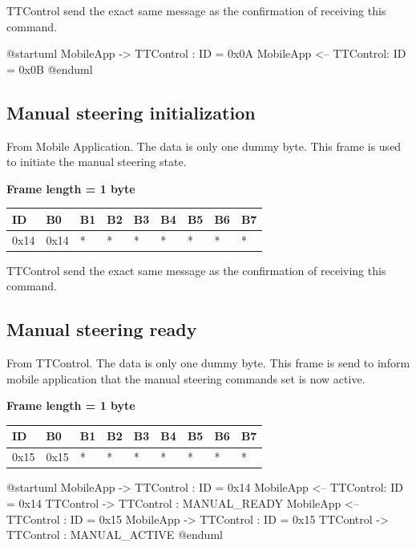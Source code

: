 \documentclass{article}
\begin{document}
TTControl send the exact same message as the confirmation of receiving this command.

\begin{plantuml}
    @startuml
    MobileApp -> TTControl : ID = 0x0A
    MobileApp <-- TTControl: ID = 0x0B
    @enduml
\end{plantuml}

\subsection{Manual steering initialization}
From Mobile Application. The data is only one dummy byte. This frame is used to initiate the manual steering state.

\textbf{Frame length = 1 byte}
\begin{center}
    \begin{tabular}{| p{20pt} | p{40pt} | p{40pt} | p{40pt} | p{40pt} | p{40pt} | p{40pt} | p{40pt} | p{40pt} |}
        \hline
        ID   & B0   & B1 & B2 & B3 & B4 & B5 & B6 & B7 \\
        \hline
        0x14 & 0x14 & *  & *  & *  & *  & *  & *  & *  \\
        \hline
    \end{tabular}
\end{center}
TTControl send the exact same message as the confirmation of receiving this command.
\subsection{Manual steering ready}
From TTControl. The data is only one dummy byte. This frame is send to inform mobile application that the manual steering commands set is now active.

\textbf{Frame length = 1 byte}
\begin{center}
    \begin{tabular}{| p{20pt} | p{40pt} | p{40pt} | p{40pt} | p{40pt} | p{40pt} | p{40pt} | p{40pt} | p{40pt} |}
        \hline
        ID   & B0   & B1 & B2 & B3 & B4 & B5 & B6 & B7 \\
        \hline
        0x15 & 0x15 & *  & *  & *  & *  & *  & *  & *  \\
        \hline
    \end{tabular}
\end{center}

\begin{plantuml}
    @startuml
    MobileApp -> TTControl : ID = 0x14
    MobileApp <-- TTControl: ID = 0x14
    TTControl -> TTControl : MANUAL_READY
    MobileApp <-- TTControl : ID = 0x15
    MobileApp -> TTControl : ID = 0x15
    TTControl -> TTControl : MANUAL_ACTIVE
    @enduml
\end{plantuml}
\end{document}
